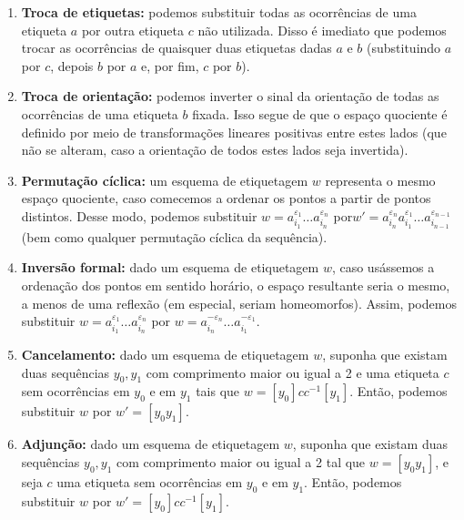 \begin{prop}
\begin{enumerate}
        \item \textbf{Troca de etiquetas:} podemos substituir todas as ocorrências de uma etiqueta $a$ por outra etiqueta $c$ não utilizada. Disso é imediato que podemos trocar as ocorrências de quaisquer duas etiquetas dadas $a$ e $b$ (substituindo $a$ por $c$, depois $b$ por $a$ e, por fim, $c$ por $b$).
        
        \item \textbf{Troca de orientação:} podemos inverter o sinal da orientação de todas as ocorrências de uma etiqueta $b$ fixada. Isso segue de que o espaço quociente é definido por meio de transformações lineares positivas entre estes lados (que não se alteram, caso a orientação de todos estes lados seja invertida).
        
        \item \textbf{Permutação cíclica:} um esquema de etiquetagem $w$ representa o mesmo espaço quociente, caso comecemos a ordenar os pontos a partir de pontos distintos. Desse modo, podemos substituir $w = a_{i_1}^{\varepsilon_1} \ldots a_{i_n}^{\varepsilon_n}$ por\break $w' = a_{i_n}^{\varepsilon_n} a_{i_1}^{\varepsilon_1} \ldots a_{i_{n-1}}^{\varepsilon_{n-1}}$ (bem como qualquer permutação cíclica da sequência).
    
        \item \textbf{Inversão formal:} dado um esquema de etiquetagem $w$, caso usássemos a ordenação dos pontos em sentido horário, o espaço resultante seria o mesmo, a menos de uma reflexão (em especial, seriam homeomorfos). Assim, podemos substituir $w = a_{i_1}^{\varepsilon_1} \ldots a_{i_n}^{\varepsilon_n}$ por $w = a_{i_n}^{-\varepsilon_n} \ldots a_{i_1}^{-\varepsilon_1}$.

        \item \textbf{Cancelamento:} dado um esquema de etiquetagem $w$, suponha que existam duas sequências $y_0, y_1$ com comprimento maior ou igual a 2 e uma etiqueta $c$ sem ocorrências em $y_0$ e em $y_1$ tais que $w = [y_0] cc^{-1} [y_1]$. Então, podemos substituir $w$ por $w' = [y_0 y_1]$.

        \item \textbf{Adjunção:} dado um esquema de etiquetagem $w$, suponha que existam duas sequências $y_0, y_1$ com comprimento maior ou igual a 2 tal que $w = [y_0 y_1]$, e seja $c$ uma etiqueta sem ocorrências em $y_0$ e em $y_1$. Então, podemos substituir $w$ por $w' = [y_0] cc^{-1} [y_1]$.
    \end{enumerate}
\end{prop}

